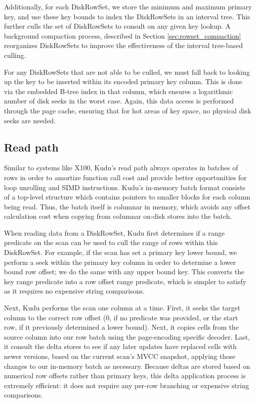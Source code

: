 \documentclass[twocolumn,9pt]{article}
\begin{document}
Additionally, for each DiskRowSet, we store the minimum and maximum primary key, and use these
key bounds to index the DiskRowSets in an interval tree. This further culls
the set of DiskRowSets to consult on any given key lookup. A background compaction process,
described in Section \ref{sec:rowset_compaction} reorganizes DiskRowSets to improve the effectiveness
of the interval tree-based culling.

For any DiskRowSets that are not able to be culled, we must fall back to looking up the
key to be inserted within its encoded primary key column. This is done via the embedded
B-tree index in that column, which ensures a logarithmic number of disk seeks in the worst
case. Again, this data access is performed through the page cache, ensuring that for hot
areas of key space, no physical disk seeks are needed.


\subsection{Read path}

Similar to systems like X100\cite{x100}, Kudu's read path always operates in batches of rows in order to
amortize function call cost and provide better opportunities for loop unrolling and SIMD
instructions. Kudu's in-memory batch format consists of a top-level structure which contains
pointers to smaller blocks for each column being read. Thus, the batch itself is columnar in
memory, which avoids any offset calculation cost when copying from columnar on-disk stores
into the batch.

When reading data from a DiskRowSet, Kudu first determines if a range predicate on the scan
can be used to cull the range of rows within this DiskRowSet. For example, if the scan has
set a primary key lower bound, we perform a seek within the primary key column in order
to determine a lower bound row offset; we do the same with any upper bound key. This converts
the key range predicate into a row offset range predicate, which is simpler to satisfy as it
requires no expensive string comparisons.

Next, Kudu performs the scan one column at a time. First, it seeks the target column to the
correct row offset (0, if no predicate was provided, or the start row, if it previously
determined a lower bound). Next, it copies cells from the source column into our row batch
using the page-encoding specific decoder. Last, it consult the delta stores to see if
any later updates have replaced cells with newer versions, based on the current scan's
MVCC snapshot, applying those changes to our in-memory batch as necessary. Because deltas
are stored based on numerical row offsets rather than primary keys, this delta application
process is extremely efficient: it does not require any per-row branching or expensive
string comparisons.
\end{document}
